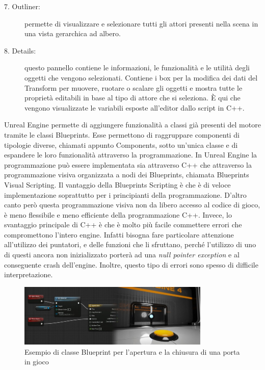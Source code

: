\begin{description}
    \item [7. Outliner:] permette di visualizzare e selezionare tutti gli attori presenti nella scena in una vista gerarchica ad albero.
    \item [8. Details:] questo pannello contiene le informazioni, le funzionalità e le utilità degli oggetti che vengono selezionati. Contiene i box per la modifica dei dati del Transform per muovere, ruotare o scalare gli oggetti e mostra tutte le proprietà editabili in base al tipo di attore che si seleziona. È qui che vengono visualizzate le variabili esposte all'editor dallo script in C++.
\end{description}

Unreal Engine permette di aggiungere funzionalità a classi già presenti del motore tramite le classi Blueprints.
%
Esse permettono di raggruppare componenti di tipologie diverse, chiamati appunto Components, sotto un'unica classe e di espandere le loro funzionalità attraverso la programmazione.
%
In Unreal Engine la programmazione può essere implementata sia attraverso C++ che attraverso la programmazione visiva organizzata a nodi dei Blueprints, chiamata Blueprints Visual Scripting. 
%
Il vantaggio della Blueprints Scripting è che è di veloce implementazione soprattutto per i principianti della programmazione. 
%
D'altro canto però questa programmazione visiva non da libero accesso al codice di gioco, è meno flessibile e meno efficiente della programmazione C++.
%
Invece, lo svantaggio principale di C++ è che è molto più facile commettere errori che compromettono l'intero engine.
%
Infatti bisogna fare particolare attenzione all'utilizzo dei puntatori, e delle funzioni che li sfruttano, perché l'utilizzo di uno di questi ancora non inizializzato porterà ad una \textit{null pointer exception} e al conseguente crash dell'engine.
%
Inoltre, questo tipo di errori sono spesso di difficile interpretazione.

\begin{figure}[h!]
    \centering
    \includegraphics[height=3cm]{figure/BlueprintClass.jpg}
    \caption{Esempio di classe Blueprint per l'apertura e la chiusura di una porta in gioco}
\end{figure}

